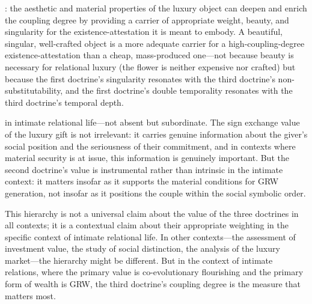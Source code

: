 : the aesthetic and material properties of the luxury object can deepen and enrich the coupling degree by providing a carrier of appropriate weight, beauty, and singularity for the existence-attestation it is meant to embody. A beautiful, singular, well-crafted object is a more adequate carrier for a high-coupling-degree existence-attestation than a cheap, mass-produced one---not because beauty is necessary for relational luxury (the flower is neither expensive nor crafted) but because the first doctrine's singularity resonates with the third doctrine's non-substitutability, and the first doctrine's double temporality resonates with the third doctrine's temporal depth.

 in intimate relational life---not absent but subordinate. The sign exchange value of the luxury gift is not irrelevant: it carries genuine information about the giver's social position and the seriousness of their commitment, and in contexts where material security is at issue, this information is genuinely important. But the second doctrine's value is instrumental rather than intrinsic in the intimate context: it matters insofar as it supports the material conditions for GRW generation, not insofar as it positions the couple within the social symbolic order.

This hierarchy is not a universal claim about the value of the three doctrines in all contexts; it is a contextual claim about their appropriate weighting in the specific context of intimate relational life. In other contexts---the assessment of investment value, the study of social distinction, the analysis of the luxury market---the hierarchy might be different. But in the context of intimate relations, where the primary value is co-evolutionary flourishing and the primary form of wealth is GRW, the third doctrine's coupling degree is the measure that matters most.
